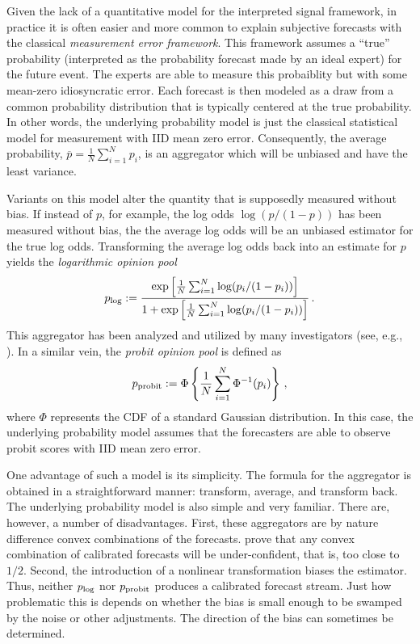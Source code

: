 \documentclass[11pt]{article}
\theoremstyle{definition}
\theoremstyle{definition}
\def\pb{\overline{p}}
\def\probit{p_{\rm probit}}
\def\plog{p_{\rm log}}
\begin{document}
Given the lack of a quantitative model for the interpreted signal framework, in practice it is often easier and more common to explain subjective
forecasts with the classical {\em measurement error framework}.  This framework assumes a ``true'' probability (interpreted
as the probability forecast made by an ideal expert) for the future 
event.  The experts are able to measure this probaiblity but with
some mean-zero idiosyncratic error.  Each forecast is then modeled
as a draw from a common probability distribution that is typically 
centered at the true probability.  
%
In other words, the underlying probability model is just the classical statistical
model for measurement with IID mean zero error.  Consequently, the average probability, $\pb = \frac{1}{N}\sum_{i=1}^N p_i$,
is an aggregator which will be unbiased and have the least variance.

Variants on this model alter the quantity that is supposedly 
measured without bias.  If instead of $p$, for example,
the log odds $\log (p/(1-p))$ has been measured without bias, 
the the average log odds will be an unbiased estimator for
the true log odds.  Transforming the average log odds back into
an estimate for $p$ yields the {\em logarithmic opinion pool}
$$\plog := \frac{\exp \left [ \frac{1}{N} \sum_{i=1}^N
   \log (p_i / (1-p_i)) \right ]}
{1 + \exp \left [ \frac{1}{N} \sum_{i=1}^N
   \log (p_i / (1-p_i)) \right ]} \, .$$
This aggregator has been analyzed and utilized by many investigators
(see, e.g., \citet{dawid1995coherent, Genest, bacharach1975group}).
In a similar vein, the {\em probit opinion pool} is defined as
$$\probit := \Phi \left \{ \frac{1}{N} \sum_{i=1}^N \Phi^{-1}
   (p_i) \right \} \, ,$$
 where $\Phi$ represents the CDF of a standard Gaussian distribution. In this case, the underlying probability model assumes that the forecasters are able
to observe probit scores with IID mean zero error.

One advantage of such a model is its simplicity.  The formula
for the aggregator is obtained in a straightforward manner: 
transform, average, and transform back.  The underlying probability
model is also simple and very familiar.  There are, however, a number
of disadvantages.  First, these aggregators are by nature difference convex combinations of the forecasts. \citet{Ranjan08} prove that any convex combination of calibrated forecasts will be under-confident, that is, too close to $1/2$. Second, the introduction of a nonlinear 
transformation biases the estimator.  Thus, neither $\plog$ 
nor $\probit$ produces a calibrated forecast stream.  Just how
problematic this is depends on whether the bias is small enough
to be swamped by the noise or other adjustments.  The direction of
the bias can sometimes be determined. 
\end{document}
